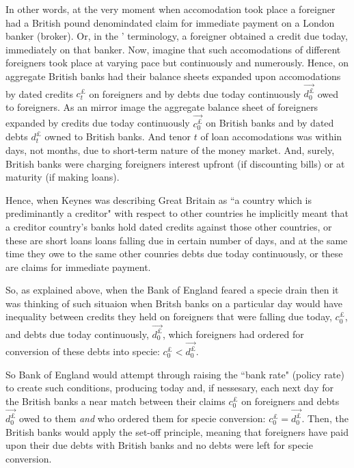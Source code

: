 In other words, at the very moment when accomodation took place a foreigner had a British pound denomindated claim for immediate payment on a London banker (broker). Or, in the \citeauthor{innes1913}' terminology, a foreigner obtained a credit due today, immediately on that banker. Now, imagine that such accomodations of different foreigners took place at varying pace but continuously and numerously. Hence, on aggregate British banks had their balance sheets expanded upon accomodations by dated credits $c^{\pounds}_t$ on foreigners and by debts due today continuously $\overrightarrow{d^{\pounds}_0}$ owed to foreigners. As an mirror image the aggregate balance sheet of foreigners expanded by credits due today continuously $\overrightarrow{c^{\pounds}_0}$ on British banks and by dated debts $d^{\pounds}_t$ owned to British banks. And tenor $t$ of loan accomodations was within days, not months, due to short-term nature of the money market. And, surely, British banks were charging foreigners interest upfront (if discounting bills) or at maturity (if making loans). 

Hence, when Keynes was describing Great Britain as ``a country which is prediminantly a creditor" with respect to other countries he implicitly meant that a creditor country's banks hold dated credits against those other countries, or these are short loans loans falling due in certain number of days, and at the same time they owe to the same other counries debts due today continuously, or these are claims for immediate payment.

So, as \citeauthor{keynes1971_1} explained above, when the Bank of England feared a specie drain then it was thinking of such situaion when Britsh banks on a particular day would have inequality between credits they held on foreigners that were falling due today, $c^{\pounds}_0$, and debts due today continuously, $\overrightarrow{d^{\pounds}_0}$, which foreigners had ordered for conversion of these debts into specie: $c^{\pounds}_0 < \overrightarrow{d^{\pounds}_0}$. 

So Bank of England would attempt through raising the ``bank rate" (policy rate) to create such conditions, producing today and, if nessesary, each next day for the British banks a near match between their claims $c^{\pounds}_0$ on foreigners and debts $\overrightarrow{d^{\pounds}_0}$ owed to them \textit{and} who ordered them for specie conversion: $c^{\pounds}_0 = \overrightarrow{d^{\pounds}_0}$. Then, the British banks would apply the set-off principle, meaning that foreigners have paid upon their due debts with British banks and no debts were left for specie conversion.

